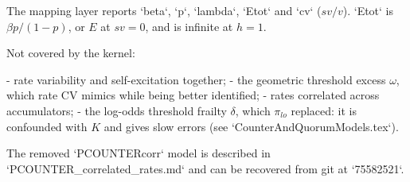 The mapping layer reports `beta`, `p`, `lambda`, `Etot` and `cv`
(\(sv/v\)). `Etot` is \(\beta p/(1-p)\), or \(E\) at \(sv=0\), and is infinite
at \(h=1\).

Not covered by the kernel:

- rate variability and self-excitation together;
- the geometric threshold excess \(\omega\), which rate CV mimics while being
  better identified;
- rates correlated across accumulators;
- the log-odds threshold frailty \(\delta\), which \(\pi_{lo}\) replaced:
  it is confounded with \(K\) and gives slow errors (see
  `CounterAndQuorumModels.tex`).

The removed `PCOUNTERcorr` model is described in
`PCOUNTER_correlated_rates.md` and can be recovered from git at `75582521`.
